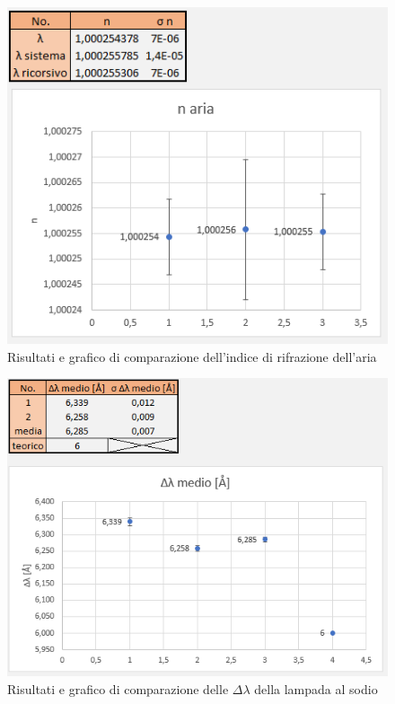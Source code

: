 \documentclass{article}
\begin{document}
\begin{figure}[h!]
  \centering
  \includegraphics[width=0.6\linewidth]{IM comparazione n}
  \caption{Risultati e grafico di comparazione dell'indice di rifrazione dell'aria}
\end{figure}

\begin{figure}[h!]
  \centering
  \includegraphics[width=0.6\linewidth]{IM comparazione delta lambda}
  \caption{Risultati e grafico di comparazione delle $\Delta\lambda$ della lampada al sodio}
\end{figure}
\end{document}
